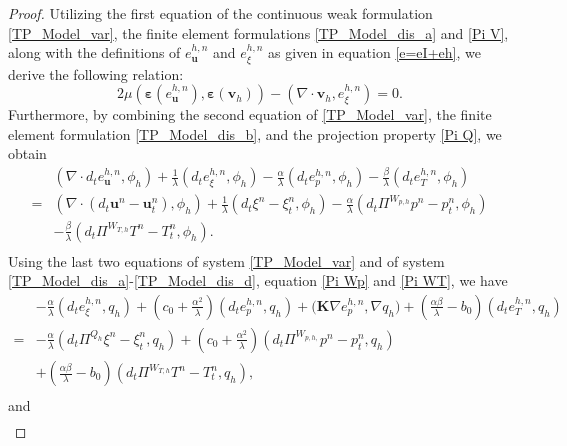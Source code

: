 \documentclass{article}
\numberwithin{equation}{section}
\begin{document}
\begin{proof}
Utilizing the first equation of the continuous weak formulation \eqref{TP_Model_var}, the finite element formulations \eqref{TP_Model_dis_a} and \eqref{Pi V}, along with the definitions of \( e_{\bm u}^{h,n} \) and \( e_\xi^{h,n} \) as given in equation \eqref{e=eI+eh}, we derive the following relation:  
\begin{equation}\label{dt-d/dt u}
  2\mu(\bm\varepsilon(e_{\bm u}^{h,n}), \bm\varepsilon(\bm v_h)) - (\nabla\cdot\bm v_h, e_\xi^{h,n}) = 0.
\end{equation}  
Furthermore, by combining the second equation of \eqref{TP_Model_var}, the finite element formulation \eqref{TP_Model_dis_b}, and the projection property \eqref{Pi Q}, we obtain
 \begin{equation}\label{dt-d/dt xi}
\begin{aligned} 
 & (\nabla\cdot d_te_{\bm u}^{h,n},\phi_h)+\frac{1}{\lambda}(d_te_\xi^{h,n},\phi_h)
   -\frac{\alpha}{\lambda}(d_te_p^{h,n},\phi_h)-\frac{\beta}{\lambda}(d_te_T^{h,n},\phi_h)\\
  = & (\nabla\cdot (d_t\bm u^n- \bm u_t^n ),\phi_h)
    +\frac{1}{\lambda}(d_t\xi^n- \xi_t^n,\phi_h)
   -\frac{\alpha}{\lambda}( d_t\Pi^{W_{p,h}}p^n- p_t^n,\phi_h)\\
  & -\frac{\beta}{\lambda}(d_t\Pi^{W_{T,h}}T^n- T_t^n,\phi_h).\\
\end{aligned}
\end{equation} 
Using the last two equations of system \eqref{TP_Model_var} 
and of system \eqref{TP_Model_dis_a}-\eqref{TP_Model_dis_d}, equation \eqref{Pi Wp} and \eqref{Pi WT}, we have
 \begin{equation}\label{eq: dt-d/dt p T 1}
\begin{aligned}  
 &-\frac\alpha\lambda(d_te_\xi^{h,n} ,q_h)+(c_0+\frac{\alpha^2}{\lambda})(d_te_p^{h,n} ,q_h)
 +\bm (\bm K\nabla e_p^{h,n},\nabla q_h)+ (\frac{\alpha\beta}{\lambda}-b_0)(d_te_T^{h,n} ,q_h)\\
  =&-\frac\alpha\lambda(d_t\Pi^{Q_h} \xi^n- \xi_t^n ,q_h)
  +(c_0+\frac{\alpha^2}{\lambda})(d_t\Pi^{W_{p,h,}}p^n- p_t^n ,q_h) \\
&+ (\frac{\alpha\beta}{\lambda}-b_0)(d_t\Pi^{W_{T,h}}T^n - T_t^n,q_h) ,\\
\end{aligned}
\end{equation}
and
 \begin{equation}\label{eq: dt-d/dt p T 2}
\begin{aligned}  

\end{aligned}
\end{equation}
\end{proof}
\end{document}
